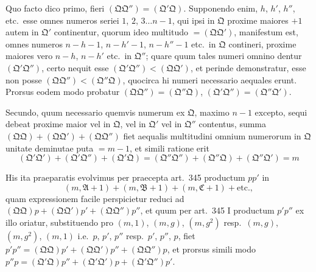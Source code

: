 \documentclass[12pt,a4paper]{article}
\theoremstyle{plain}
\theoremstyle{definition}
\theoremstyle{remark}
\begin{document}
Quo facto dico primo, fieri $(\mathfrak{Q}\mathfrak{Q}'') = (\mathfrak{Q}'\mathfrak{Q})$. Supponendo enim, $h$, $h'$, $h''$, etc.\ esse omnes numeros seriei $1$, $2$, $3 \ldots n-1$, qui ipsi in $\mathfrak{Q}$ proxime maiores $+1$ autem in $\mathfrak{Q}'$ continentur, quorum ideo multitudo $= (\mathfrak{Q}\mathfrak{Q}')$, manifestum est, omnes numeros $n-h-1$, $n-h'-1$, $n-h''-1$ etc.\ in $\mathfrak{Q}$ contineri, proxime maiores vero $n-h$, $n-h'$ etc.\ in $\mathfrak{Q}''$; quare quum tales numeri omnino dentur $(\mathfrak{Q}'\mathfrak{Q}'')$, certo nequit esse $(\mathfrak{Q}'\mathfrak{Q}'') < (\mathfrak{Q}\mathfrak{Q}')$, et perinde demonstratur, esse non posse $(\mathfrak{Q}\mathfrak{Q}'') < (\mathfrak{Q}''\mathfrak{Q})$, quocirca hi numeri necessario aequales erunt. Prorsus eodem modo probatur $(\mathfrak{Q}\mathfrak{Q}'') = (\mathfrak{Q}''\mathfrak{Q})$, $(\mathfrak{Q}'\mathfrak{Q}'') = (\mathfrak{Q}''\mathfrak{Q}')$.

Secundo, quum necessario quemvis numerum ex $\mathfrak{Q}$, maximo $n-1$ excepto, sequi debeat proxime maior vel in $\mathfrak{Q}$, vel in $\mathfrak{Q}'$ vel in $\mathfrak{Q}''$ contentus, summa $(\mathfrak{Q}\mathfrak{Q}) + (\mathfrak{Q}\mathfrak{Q}') + (\mathfrak{Q}\mathfrak{Q}'')$ fiet aequalis multitudini omnium numerorum in $\mathfrak{Q}$ unitate deminutae puta $= m-1$, et simili ratione erit
\[(\mathfrak{Q}'\mathfrak{Q}') + (\mathfrak{Q}'\mathfrak{Q}'') + (\mathfrak{Q}'\mathfrak{Q}) = (\mathfrak{Q}''\mathfrak{Q}'') + (\mathfrak{Q}''\mathfrak{Q}) + (\mathfrak{Q}''\mathfrak{Q}') = m\]

His ita praeparatis evolvimus per praecepta art.\ 345 productum $pp'$ in
\[(m, \mathfrak{A}+1) + (m, \mathfrak{B}+1) + (m, \mathfrak{C}+1) + \text{etc.},\]
quam expressionem facile perspicietur reduci ad $(\mathfrak{Q}\mathfrak{Q})p + (\mathfrak{Q}\mathfrak{Q}')p' + (\mathfrak{Q}\mathfrak{Q}'')p''$, et quum per art.\ 345 I productum $p'p''$ ex illo oriatur, substituendo pro $(m,1)$, $(m,g)$, $(m,g^2)$ resp.\ $(m,g)$, $(m,g^2)$, $(m,1)$ i.e.\ $p$, $p'$, $p''$ resp.\ $p'$, $p''$, $p$, fiet $p'p'' = (\mathfrak{Q}\mathfrak{Q})p' + (\mathfrak{Q}\mathfrak{Q}')p'' + (\mathfrak{Q}\mathfrak{Q}'')p$, et prorsus simili modo $p''p = (\mathfrak{Q}'\mathfrak{Q})p'' + (\mathfrak{Q}'\mathfrak{Q}')p + (\mathfrak{Q}'\mathfrak{Q}'')p'$.
\end{document}
